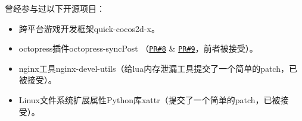 \documentclass[letterpaper]{article}
\begin{document}
\begin{itemize}
\end{itemize}

曾经参与过以下开源项目：
\begin{itemize}
    \item 跨平台游戏开发框架quick-cocos2d-x。
    \item octopress插件octopress-syncPost （\href{https://github.com/huangbowen521/octopress-syncPost/pull/8}{\tt PR\#8} \& \href{https://github.com/huangbowen521/octopress-syncPost/pull/9}{\tt PR\#9}，前者被接受）。
    \item nginx工具nginx-devel-utils（给lua内存泄漏工具提交了一个简单的patch，已被接受）。
    \item Linux文件系统扩展属性Python库xattr（提交了一个简单的patch，已被接受）。
\end{itemize}
\end{document}
